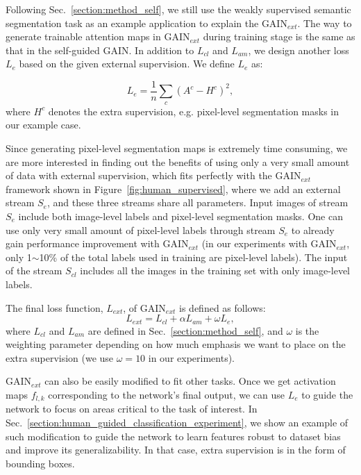 \documentclass[10pt,twocolumn,letterpaper]{article}
\begin{document}
Following Sec.~\ref{section:method_self}, we still use the weakly supervised semantic segmentation task as an example application to explain the GAIN$_{ext}$. The way to generate trainable attention maps in GAIN$_{ext}$ during training stage is the same as that in the self-guided GAIN. In addition to $L_{cl}$ and $L_{am}$, we design another loss $L_e$ based on the given external supervision. We define $L_e$ as:


\begin{equation}
\label{eq:human_guided_loss}
{L_e} = \frac{1}{n}\sum\limits_c {{{\left( {{A^c} - {H^c}} \right)}^2}},
\end{equation}
where ${H^c}$ denotes the extra supervision, e.g. pixel-level segmentation masks in our example case.


Since generating pixel-level segmentation maps is extremely time consuming, we are more interested in finding out the benefits of using only a very small amount of data with external supervision, which fits perfectly with the GAIN$_{ext}$ framework shown in Figure~\ref{fig:human_supervised}, where we add an external stream ${S_e}$, and these three streams share all parameters. Input images of stream ${S_e}$ include both image-level labels and pixel-level segmentation masks. One can use only very small amount of pixel-level labels through stream ${S_e}$ to already gain performance improvement with GAIN$_{ext}$ (in our experiments with GAIN$_{ext}$, only 1$\sim$10\% of the total labels used in training are pixel-level labels). The input of the stream $S_{cl}$ includes all the images in the training set with only image-level labels.


The final loss function, $L_{ext}$, of GAIN$_{ext}$ is defined as follows:
\begin{equation}
\label{eq:human_guidance_loss_final}
L_{ext} = L_{cl} + \alpha L_{am} + \omega L_e,
\end{equation} 
where $L_{cl}$ and $L_{am}$ are defined in Sec.~\ref{section:method_self}, and $\omega$ is the weighting parameter depending on how much emphasis we want to place on the extra supervision (we use $\omega  = 10$ in our experiments).


GAIN$_{ext}$ can also be easily modified to fit other tasks. Once we get activation maps $f_{l,k}$ corresponding to the network's final output, we can use $L_e$ to guide the network to focus on areas critical to the task of interest. In Sec.~\ref{section:human_guided_classification_experiment}, we show an example of such modification to guide the network to learn features robust to dataset bias and improve its generalizability. In that case, extra supervision is in the form of bounding boxes. %
\end{document}
